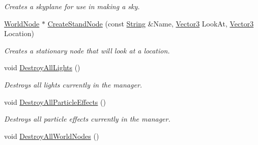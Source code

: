 \begin{DoxyCompactItemize}
\begin{DoxyCompactList}\small\item\em Creates a skyplane for use in making a sky. \item\end{DoxyCompactList}\item 
\hyperlink{classphys_1_1WorldNode}{WorldNode} $\ast$ \hyperlink{classphys_1_1SceneManager_afb93b25cdd669066481e7bc81c33674a}{CreateStandNode} (const \hyperlink{namespacephys_aa03900411993de7fbfec4789bc1d392e}{String} \&Name, \hyperlink{classphys_1_1Vector3}{Vector3} LookAt, \hyperlink{classphys_1_1Vector3}{Vector3} Location)
\begin{DoxyCompactList}\small\item\em Creates a stationary node that will look at a location. \item\end{DoxyCompactList}\item 
\hypertarget{classphys_1_1SceneManager_a6246fbc7c12300416dfc99bdbb22d002}{
void \hyperlink{classphys_1_1SceneManager_a6246fbc7c12300416dfc99bdbb22d002}{DestroyAllLights} ()}
\label{classphys_1_1SceneManager_a6246fbc7c12300416dfc99bdbb22d002}

\begin{DoxyCompactList}\small\item\em Destroys all lights currently in the manager. \item\end{DoxyCompactList}\item 
\hypertarget{classphys_1_1SceneManager_ac70441dd536d4b9be2c2143148b75420}{
void \hyperlink{classphys_1_1SceneManager_ac70441dd536d4b9be2c2143148b75420}{DestroyAllParticleEffects} ()}
\label{classphys_1_1SceneManager_ac70441dd536d4b9be2c2143148b75420}

\begin{DoxyCompactList}\small\item\em Destroys all particle effects currently in the manager. \item\end{DoxyCompactList}\item 
\hypertarget{classphys_1_1SceneManager_a0a4f1d371b91848f1fac32aac153cc10}{
void \hyperlink{classphys_1_1SceneManager_a0a4f1d371b91848f1fac32aac153cc10}{DestroyAllWorldNodes} ()}
\label{classphys_1_1SceneManager_a0a4f1d371b91848f1fac32aac153cc10}


\end{DoxyCompactItemize}

